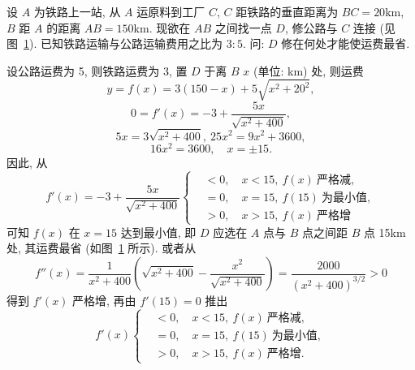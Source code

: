 \begin{example}\label{ex:3.5.14}
设 $A$ 为铁路上一站, 从 $A$ 运原料到工厂 $C$, $C$ 距铁路的垂直距离为 $BC=20$km, $B$ 距 $A$ 的距离 $AB=150$km. 现欲在 $AB$ 之间找一点 $D$, 修公路与 $C$ 连接 (见图~\ref{fig:3.5.5}). 已知铁路运输与公路运输费用之比为 $3:5$. 问: $D$ 修在何处才能使运费最省.
\end{example}

\begin{solution}
设公路运费为 5, 则铁路运费为 3, 置 $D$ 于离 $B$ $x$ (单位: km) 处, 则运费
\[
y=f(x)=3(150-x)+5\sqrt{x^{2}+20^{2}},
\]
\[
0=f'(x)=-3+\frac{5x}{\sqrt{x^{2}+400}},
\]
\[
5x=3\sqrt{x^{2}+400},\ 25x^{2}=9x^{2}+3600,
\]
\[
16x^{2}=3600,\quad x=\pm 15.
\]
因此, 从
\[
f'(x)=-3+\frac{5x}{\sqrt{x^{2}+400}}
\left\{
\begin{aligned}
&<0,\quad x<15,\ f(x)\ \text{严格减},\\
&=0,\quad x=15,\ f(15)\ \text{为最小值},\\
&>0,\quad x>15,\ f(x)\ \text{严格增}
\end{aligned}
\right.
\]
可知 $f(x)$ 在 $x=15$ 达到最小值, 即 $D$ 应选在 $A$ 点与 $B$ 点之间距 $B$ 点 15km 处, 其运费最省 (如图~\ref{fig:3.5.5} 所示). 或者从
\[
f''(x)=\frac{1}{x^{2}+400}\left(\sqrt{x^{2}+400}-\frac{x^{2}}{\sqrt{x^{2}+400}}\right)=\frac{2000}{(x^{2}+400)^{3/2}}>0
\]
得到 $f'(x)$ 严格增, 再由 $f'(15)=0$ 推出
\[
f'(x)\left\{
\begin{aligned}
&<0,\quad x<15,\ f(x)\ \text{严格减},\\
&=0,\quad x=15,\ f(15)\ \text{为最小值},\\
&>0,\quad x>15,\ f(x)\ \text{严格增}.
\end{aligned}
\right.
\]
\end{solution}

\begin{figure}[htbp]
\centering
{}
\caption{}\label{fig:3.5.5}
\end{figure}

